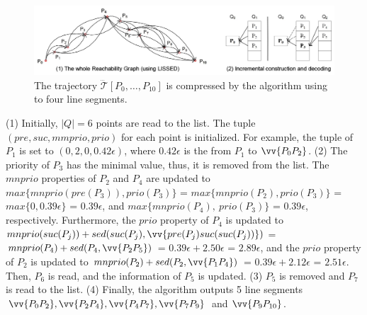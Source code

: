 \begin{figure}[tb!]
	\centering
	\includegraphics[scale=0.8]{Figures/Fig-DOTS.jpg}
	\vspace{-2ex}
	\caption{\small The trajectory $\dddot{\mathcal{T}}[P_0, \ldots, P_{10}]$ is compressed by the \dagots algorithm using \lissed to four line segments. }
	\vspace{-1ex}
	\label{fig:dots}
\end{figure}



\begin{example}
	\label{exm-alg-dots}
	(1) Initially, $|Q| = 6$ points are read to the list. The tuple $(pre, suc, mmprio, prio)$ for each point is initialized. For example, the tuple of $P_1$ is set to $(0, 2, 0, 0.42\epsilon)$, where $0.42\epsilon$ is the \sed from $P_1$ to $\vv{P_0P_2}$.
	(2) The priority of $P_3$ has the minimal value, thus, it is removed from the list.
	The $mnprio$ properties of $P_2$ and $P_4$ are updated to $max\{mnprio(pre(P_3)), prio(P_3)\}$ = $max\{mnprio(P_2), prio(P_3)\}$ = $max\{0, 0.39\epsilon\}$ = $0.39\epsilon$, and $max\{mnprio(P_4), ~prio(P_3)\}$ = $0.39\epsilon$, respectively.
	Furthermore, the $prio$ property of $P_4$ is updated to $mnprio(suc(P_j)) + sed(suc(P_j),\vv{pre(P_{j})suc(suc(P_{j}))})$ = $mnprio(P_4) + sed(P_4,\vv{P_2P_5})$ = $0.39\epsilon + 2.50\epsilon$ = $2.89\epsilon$, and the $prio$ property of $P_2$ is updated to $mnprio(P_2) + sed(P_2,\vv{P_1P_4})$ = $0.39\epsilon + 2.12\epsilon$ = $2.51\epsilon$.
	Then, $P_6$ is read, and the information of $P_5$ is updated.
	(3) $P_5$ is removed and $P_7$ is read to the list.
	(4) Finally, the algorithm outputs 5 line segments $\vv{P_0P_2},\vv{P_2P_4},\vv{P_4P_7},\vv{P_7P_9}$ and $\vv{P_9P_{10}}$.
\end{example}




